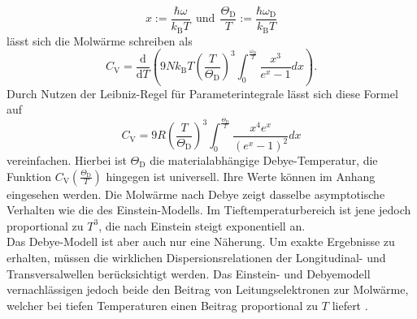 \begin{equation}
  x := \frac{\hbar\omega}{k_{\text{B}}T} \:\: \text{und} \:\: \frac{\Theta_{\text{D}}}{T} := \frac{\hbar\omega_{\text{D}}}{k_{\text{B}}T} \label{eqn:4}
\end{equation}
lässt sich die Molwärme schreiben als
\begin{equation}
  C_{\text{V}} = \frac{\mathrm{d}}{\mathrm{d}T} \left( 9N k_{\text{B}}T \left(\frac{T}{\Theta_{\text{D}}}\right)^3 \int_{0}^{\frac{\omega_{\text{D}}}{T}}\frac{x^3}{e^x-1}dx\right).
\end{equation}
Durch Nutzen der Leibniz-Regel für Parameterintegrale lässt sich diese Formel auf
\begin{equation}
  C_{\text{V}} = 9R \left(\frac{T}{\Theta_{\text{D}}}\right)^3 \int_{0}^{\frac{\Theta_{\text{D}}}{T}} \frac{x^4e^x}{\left(e^x-1\right)^2}dx
\end{equation}
vereinfachen.
Hierbei ist $\Theta_{\text{D}}$ die materialabhängige Debye-Temperatur, die Funktion $C_{\text{V}}\left(\frac{\Theta_{\text{D}}}{T}\right)$ hingegen ist universell.
Ihre Werte können im Anhang eingesehen werden.
Die Molwärme nach Debye zeigt dasselbe asymptotische Verhalten wie die des Einstein-Modells.
Im Tieftemperaturbereich ist jene jedoch proportional zu $T^3$, die nach Einstein steigt exponentiell an.\\
Das Debye-Modell ist aber auch nur eine Näherung.
Um exakte Ergebnisse zu erhalten, müssen die wirklichen Dispersionsrelationen der Longitudinal- und Transversalwellen berücksichtigt werden.
Das Einstein- und Debyemodell vernachlässigen jedoch beide den Beitrag von Leitungselektronen zur Molwärme, welcher bei tiefen Temperaturen einen Beitrag proportional zu $T$ liefert \cite{skript}.
